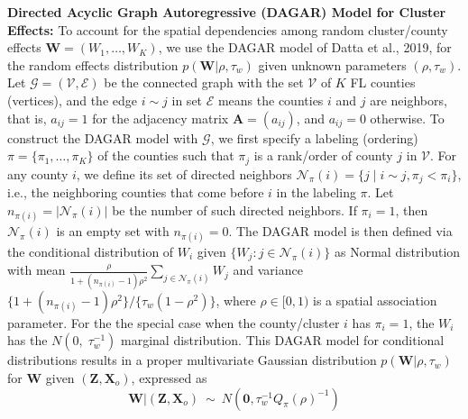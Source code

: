 \documentclass[aoas]{imsart}
\theoremstyle{plain}
\theoremstyle{definition}
\begin{document}
\textbf{Directed Acyclic Graph Autoregressive (DAGAR) Model for Cluster Effects:}
To account for the spatial dependencies among random cluster/county effects $\mathbf{W} = (W_1, \ldots, W_K)$, we use the DAGAR model of Datta et al., 2019, \parencite{datta2019dagar} for the 
random effects distribution $p(\mathbf{W}\vert \rho,\tau_w)$ given unknown parameters $(\rho,\tau_w)$. 
Let $\mathcal{G} = (\mathcal{V}, \mathcal{E})$ be the connected graph with the set $\mathcal{V}$ of $K$ FL counties (vertices), and the edge $i\sim j$ in set $\mathcal{E}$ means the counties $i$ and $j$ are neighbors, that is, $a_{ij} = 1$ for the adjacency matrix $\mathbf{A} = (a_{ij})$, and $a_{ij} = 0$ otherwise. 
To construct the DAGAR model with $\mathcal{G}$, we first specify a labeling (ordering) $\pi = \{\pi_1, \ldots, \pi_K\}$ of the counties such that $\pi_j$ is a rank/order of county $j$ in $\mathcal{V}$. For any county $i$, we define its set of directed neighbors $\mathcal{N}_\pi(i) = \{j \mid i \sim j, \pi_j < \pi_i\}$, i.e., the neighboring counties that come before $i$ in the labeling $\pi$. Let $n_{\pi(i)} = |\mathcal{N}_\pi(i)|$ be the number of such directed neighbors.
If  $\pi_i = 1$, then $\mathcal{N}_\pi(i)$ is an empty set with $n_{\pi(i)}=0$. 
The DAGAR model is then defined via the conditional distribution of $W_i$ given $\{W_j :j\in \mathcal{N}_\pi(i)\}$ as Normal distribution with mean $\frac{\rho}{1+(n_{\pi(i)}-1)\rho^2}\sum_{j\in \mathcal{N}_\pi(i)} W_j$ and variance $\{1+(n_{\pi(i)}-1)\rho^2\}/\{\tau_w(1-\rho^2)\}$,
where $\rho \in [0,1)$ is a spatial association parameter.
For the the special case when the county/cluster $i$ has $\pi_i=1$, the $W_i$
has the $ N(0,\; \tau_w^{-1})$ marginal distribution.
This DAGAR model for conditional distributions  results in a proper multivariate Gaussian distribution $p(\mathbf{W}\vert \rho,\tau_w)$ 
for $\mathbf{W}$ given $(\mathbf{Z},\mathbf{X}_o)$, expressed as 
\begin{equation}
\mathbf{W}\vert  (\mathbf{Z},\mathbf{X}_{o})\ \sim\ N(\mathbf{0}, \tau_w^{-1} Q_\pi(\rho)^{-1})
\label{eq:DAGARjoint}
\end{equation}
\end{document}
